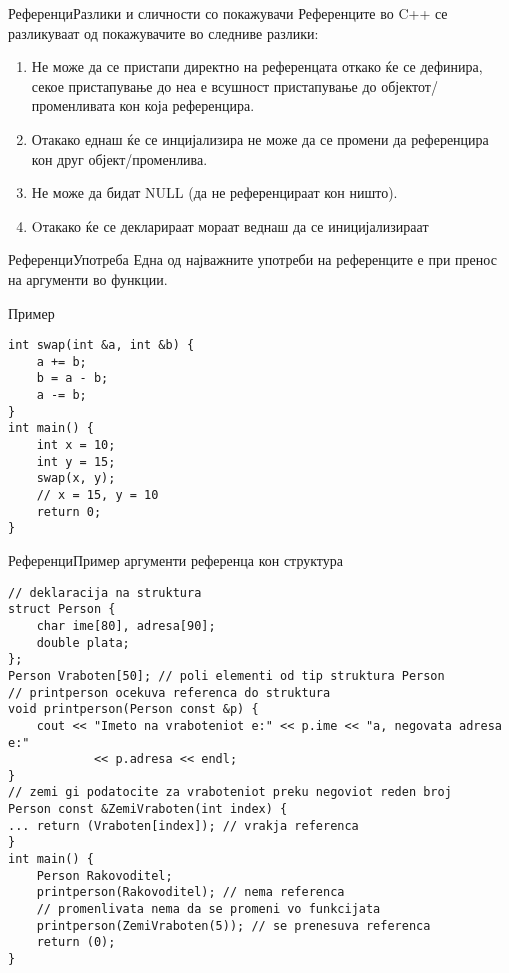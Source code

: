 \begin{frame}[fragile]{Референци}{Разлики и сличности со покажувачи}
Референците во C++ се разликуваат од покажувачите во следниве разлики:
\begin{enumerate}
  \item Не може да се пристапи директно на референцата откако ќе се дефинира,
  секое пристапување до неа е всушност пристапување до објектот/променливата кон
  која референцира.
  \item Отакако еднаш ќе се инцијализира не може да се промени да референцира
  кон друг објект/променлива.
  \item Не може да бидат NULL (да не референцираат кон ништо).
  \item Oтакако ќе се декларираат мораат веднаш да се иницијализираат
\end{enumerate}
\end{frame}

\begin{frame}[fragile]{Референци}{Употреба}
Една од најважните употреби на референците е при пренос на аргументи во функции.
\begin{exampleblock}{Пример}
\begin{lstlisting}
int swap(int &a, int &b) {
    a += b;
    b = a - b;
    a -= b;
}
int main() {
    int x = 10;
    int y = 15;
    swap(x, y);
    // x = 15, y = 10
    return 0;
}
\end{lstlisting}
\end{exampleblock}
\end{frame}

\begin{frame}[fragile]{Референци}{Пример аргументи референца кон структура}
\begin{lstlisting}
// deklaracija na struktura
struct Person {
    char ime[80], adresa[90];
    double plata;
};
Person Vraboten[50]; // poli elementi od tip struktura Person 
// printperson ocekuva referenca do struktura
void printperson(Person const &p) {
    cout << "Imeto na vraboteniot e:" << p.ime << "a, negovata adresa e:"
            << p.adresa << endl;
}
// zemi gi podatocite za vraboteniot preku negoviot reden broj
Person const &ZemiVraboten(int index) {
... return (Vraboten[index]); // vrakja referenca
}
int main() {
    Person Rakovoditel;
    printperson(Rakovoditel); // nema referenca
    // promenlivata nema da se promeni vo funkcijata
    printperson(ZemiVraboten(5)); // se prenesuva referenca
    return (0);
}
\end{lstlisting}
\end{frame}

